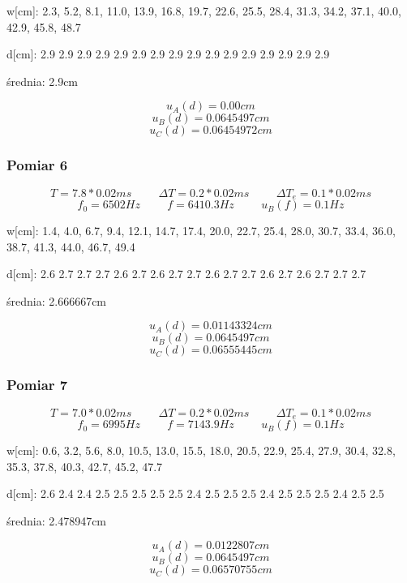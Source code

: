 \documentclass[12pt,a4paper]{article}
\begin{document}
w[cm]: 2.3, 5.2, 8.1, 11.0, 13.9, 16.8, 19.7, 22.6, 25.5, 28.4, 31.3, 34.2, 37.1, 40.0, 42.9, 45.8, 48.7

d[cm]: 2.9 2.9 2.9 2.9 2.9 2.9 2.9 2.9 2.9 2.9 2.9 2.9 2.9 2.9 2.9 2.9

\begin{center}
średnia: 2.9cm
\end{center}

$$
u_A(d) = 0.00cm
$$
$$u_B(d) = 0.0645497cm $$
$$u_C(d) = 0.06454972cm $$
\subsubsection{Pomiar 6}
$$
T = 7.8*0.02ms \hspace{1cm} \Delta T = 0.2*0.02ms \hspace{1cm} \Delta T_e = 0.1*0.02ms 
$$
$$
f_0 = 6502 Hz \hspace{1cm} f=6410.3Hz \hspace{1cm} u_B(f)=0.1Hz
$$

w[cm]: 1.4, 4.0, 6.7, 9.4, 12.1, 14.7, 17.4, 20.0, 22.7, 25.4, 28.0, 30.7, 33.4, 36.0, 38.7, 41.3, 44.0, 46.7, 49.4

d[cm]: 2.6 2.7 2.7 2.7 2.6 2.7 2.6 2.7 2.7 2.6 2.7 2.7 2.6 2.7 2.6 2.7 2.7 2.7

\begin{center}
średnia: 2.666667cm
\end{center}

$$
u_A(d) = 0.01143324cm
$$
$$u_B(d) = 0.0645497cm $$
$$u_C(d) = 0.06555445cm $$
\subsubsection{Pomiar 7}
$$
T = 7.0*0.02ms \hspace{1cm} \Delta T = 0.2*0.02ms \hspace{1cm} \Delta T_e = 0.1*0.02ms 
$$
$$
f_0 = 6995 Hz \hspace{1cm} f=7143.9Hz \hspace{1cm} u_B(f)=0.1Hz
$$

w[cm]: 0.6, 3.2, 5.6, 8.0, 10.5, 13.0, 15.5, 18.0, 20.5, 22.9, 25.4, 27.9, 30.4, 32.8, 35.3, 37.8, 40.3, 42.7, 45.2, 47.7

d[cm]: 2.6 2.4 2.4 2.5 2.5 2.5 2.5 2.5 2.4 2.5 2.5 2.5 2.4 2.5 2.5 2.5 2.4 2.5 2.5

\begin{center}
średnia: 2.478947cm
\end{center}

$$
u_A(d) = 0.0122807cm
$$
$$u_B(d) = 0.0645497cm $$
$$u_C(d) = 0.06570755cm $$
\end{document}
